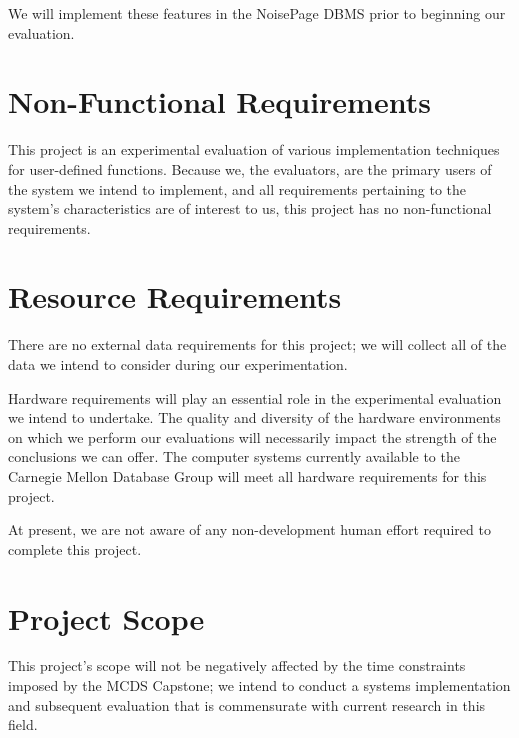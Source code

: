 \documentclass{vldb}
\begin{document}
We will implement these features in the NoisePage DBMS prior to beginning our evaluation.


\section{Non-Functional Requirements}

This project is an experimental evaluation of various implementation techniques for user-defined functions. Because we, the evaluators, are the primary users of the system we intend to implement, and all requirements pertaining to the system's characteristics are of interest to us, this project has no non-functional requirements. 


\section{Resource Requirements}

There are no external data requirements for this project; we will collect all of the data we intend to consider during our experimentation.

Hardware requirements will play an essential role in the experimental evaluation we intend to undertake. The quality and diversity of the hardware environments on which we perform our evaluations will necessarily impact the strength of the conclusions we can offer. The computer systems currently available to the Carnegie Mellon Database Group will meet all hardware requirements for this project.

At present, we are not aware of any non-development human effort required to complete this project.


\section{Project Scope}

This project's scope will not be negatively affected by the time constraints imposed by the MCDS Capstone; we intend to conduct a systems implementation and subsequent evaluation that is commensurate with current research in this field.


\newcommand{\newblock}{}

\newpage


\end{document}
